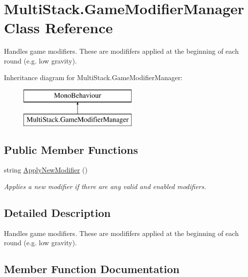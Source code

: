\hypertarget{class_multi_stack_1_1_game_modifier_manager}{}\section{Multi\+Stack.\+Game\+Modifier\+Manager Class Reference}
\label{class_multi_stack_1_1_game_modifier_manager}


Handles game modifiers. These are modififers applied at the beginning of each round (e.\+g. low gravity).  


Inheritance diagram for Multi\+Stack.\+Game\+Modifier\+Manager\+:\begin{figure}[H]
\begin{center}
\leavevmode
\includegraphics[height=2.000000cm]{class_multi_stack_1_1_game_modifier_manager}
\end{center}
\end{figure}
\subsection*{Public Member Functions}
\begin{DoxyCompactItemize}
\item 
string \hyperlink{class_multi_stack_1_1_game_modifier_manager_a1da0ad850d07870e87f3ab5601e72e05}{Apply\+New\+Modifier} ()
\begin{DoxyCompactList}\small\item\em Applies a new modifier if there are any valid and enabled modifiers. \end{DoxyCompactList}\end{DoxyCompactItemize}


\subsection{Detailed Description}
Handles game modifiers. These are modififers applied at the beginning of each round (e.\+g. low gravity). 



\subsection{Member Function Documentation}
\hypertarget{class_multi_stack_1_1_game_modifier_manager_a1da0ad850d07870e87f3ab5601e72e05}{}

